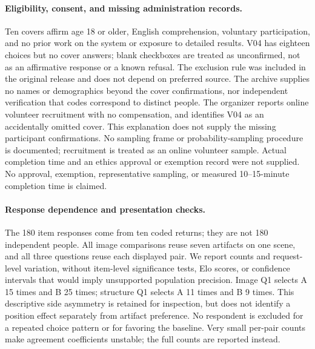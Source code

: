 \paragraph{Eligibility, consent, and missing administration records.}
Ten covers affirm age 18 or older, English comprehension, voluntary
participation, and no prior work on the system or exposure to detailed
results. V04 has eighteen choices but no cover answers; blank checkboxes are
treated as unconfirmed, not as an affirmative response or a known refusal.
The exclusion rule was included in the original release and does not depend
on preferred source. The archive supplies no names or demographics beyond
the cover confirmations, nor independent verification that codes correspond
to distinct people. The organizer reports online volunteer recruitment with no compensation,
and identifies V04 as an accidentally omitted cover. This explanation does
not supply the missing participant confirmations. No sampling frame or
probability-sampling procedure is documented; recruitment is treated as an
online volunteer sample. Actual completion time and an ethics approval or
exemption record were not supplied. No approval, exemption, representative
sampling, or measured 10--15-minute completion time is claimed.

\paragraph{Response dependence and presentation checks.}
The 180 item responses come from ten coded returns; they are not 180
independent people. All image comparisons reuse seven artifacts on one scene,
and all three questions reuse each displayed pair. We report counts and
request-level variation, without item-level significance tests, Elo scores,
or confidence intervals that would imply unsupported population precision.
Image Q1 selects A 15 times and B 25 times; structure Q1 selects A 11 times
and B 9 times. This descriptive side asymmetry is retained for inspection,
but does not identify a position effect separately from artifact preference.
No respondent is excluded for a repeated choice pattern or for favoring the
baseline. Very small per-pair counts make agreement coefficients unstable;
the full counts are reported instead.

\begin{table}[t]
\centering\small
\setlength{\tabcolsep}{5pt}

\caption{Every structure request. Each cell gives the Agora preference score
and counts (Agora wins / ties / baseline wins / Not sure). The requests,
not the number of ratings, are equally weighted in the main result.}
\label{tab:human-structure-detail}
\end{table}

